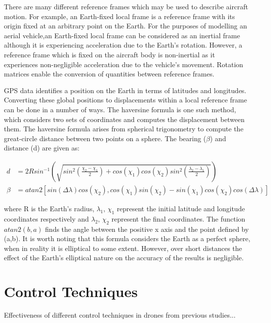 There are many different reference frames which may be used to describe aircraft motion. For example, an Earth-fixed local frame is a reference frame with its origin fixed at an arbitrary point on the Earth. For the purposes of modelling an aerial vehicle,an Earth-fixed local frame can be considered as an inertial frame although it is experiencing acceleration due to the Earth's rotation. However, a reference frame which is fixed on the aircraft body is non-inertial as it experiences non-negligible acceleration due to the vehicle's movement. Rotation matrices enable the conversion of quantities between reference frames.

GPS data identifies a position on the Earth in terms of latitudes and longitudes. Converting these global positions to displacements within a local reference frame can be done in a number of ways. The haversine formula is one such method, which considers two sets of coordinates and computes the displacement between them. The haversine formula arises from spherical trigonometry to compute the great-circle distance between two points on a sphere. The bearing ($\beta$) and distance (d) are given as:

\begin{equation}\label{eqn:haversine}
\begin{split}
d&=2R sin^{-1} \left( \sqrt{sin^{2}\left( \frac{\chi_{2}-\chi_{1}}{2} \right) +cos(\chi_{1})cos(\chi_{2})sin^{2} \left( \frac{\lambda_{2}-\lambda_{1}}{2}  \right) }\right)\\
\beta&=atan2\left[ sin(\Delta\lambda)cos(\chi_{2}) , cos(\chi_{1})sin(\chi_{2}) - sin(\chi_{1}) cos(\chi_2) cos(\Delta\lambda)\right]
\end{split}
\end{equation}

where R is the Earth's radius, $\lambda_{1}$, $\chi_{1}$ represent the initial latitude and longitude coordinates respectively and $\lambda_{2}$, $\chi_{2}$ represent the final coordinates. The function $atan2(b,a)$ finds the angle between the positive x axis and the point defined by (a,b).
It is worth noting that this formula considers the Earth as a perfect sphere, when in reality it is elliptical to some extent. However, over short distances the effect of the Earth's elliptical nature on the accuracy of the results is negligible.


\section{Control Techniques}
Effectiveness of different control techniques in drones from previous studies...

